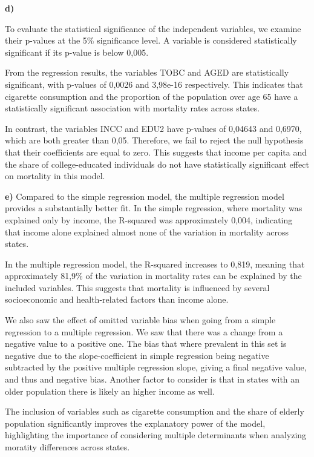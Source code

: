 \documentclass[
  letterpaper,
  DIV=11,
  numbers=noendperiod]{scrartcl}
\begin{document}
\newpage{}

\textbf{d)}

To evaluate the statistical significance of the independent variables,
we examine their p-values at the 5\% significance level. A variable is
considered statistically significant if its p-value is below 0,005.

From the regression results, the variables TOBC and AGED are
statistically significant, with p-values of 0,0026 and 3,98e-16
respectively. This indicates that cigarette consumption and the
proportion of the population over age 65 have a statistically
significant association with mortality rates across states.

In contrast, the variables INCC and EDU2 have p-values of 0,04643 and
0,6970, which are both greater than 0,05. Therefore, we fail to reject
the null hypothesis that their coefficients are equal to zero. This
suggests that income per capita and the share of college-educated
individuals do not have statistically significant effect on mortality in
this model.

\textbf{e)} Compared to the simple regression model, the multiple
regression model provides a substantially better fit. In the simple
regression, where mortality was explained only by income, the R-squared
was approximately 0,004, indicating that income alone explained almost
none of the variation in mortality across states.

In the multiple regression model, the R-squared increases to 0,819,
meaning that approximately 81,9\% of the variation in mortality rates
can be explained by the included variables. This suggests that mortality
is influenced by several socioeconomic and health-related factors than
income alone.

We also saw the effect of omitted variable bias when going from a simple
regression to a multiple regression. We saw that there was a change from
a negative value to a positive one. The bias that where prevalent in
this set is negative due to the slope-coefficient in simple regression
being negative subtracted by the positive multiple regression slope,
giving a final negative value, and thus and negative bias. Another
factor to consider is that in states with an older population there is
likely an higher income as well.

The inclusion of variables such as cigarette consumption and the share
of elderly population significantly improves the explanatory power of
the model, highlighting the importance of considering multiple
determinants when analyzing moratity differences across states.
\newpage{}
\end{document}
